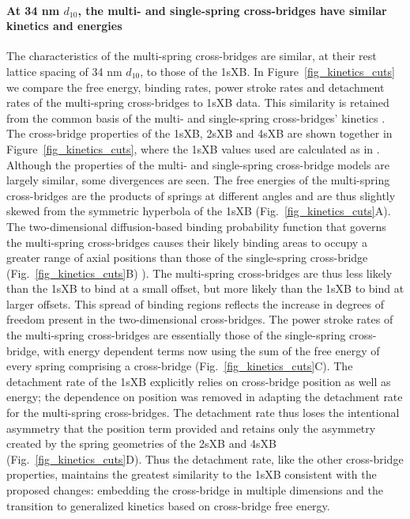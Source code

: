\documentclass[]{article}
\begin{document}
\paragraph{At 34 nm $d_{10}$, the multi- and single-spring cross-bridges have similar kinetics and energies} %
The characteristics of the multi-spring cross-bridges are similar, at their rest lattice spacing of 34 nm $d_{10}$, to those of the 1sXB\@.
In Figure~\ref{fig_kinetics_cuts} we compare the free energy, binding rates, power stroke rates and detachment rates of the multi-spring cross-bridges to 1sXB data. 
This similarity is retained from the common basis of the multi- and single-spring cross-bridges' kinetics \citep{Pate1989}.
The cross-bridge properties of the 1sXB, 2sXB and 4sXB are shown together in Figure~\ref{fig_kinetics_cuts}, where the 1sXB values used are calculated as in \citet[Fig.~10]{Tanner2007}. 
Although the properties of the multi- and single-spring cross-bridge models are largely similar, some divergences are seen. 
The free energies of the multi-spring cross-bridges are the products of springs at different angles and are thus slightly skewed from the symmetric hyperbola of the 1sXB  (Fig.~\ref{fig_kinetics_cuts}A).
The two-dimensional diffusion-based binding probability function that governs the multi-spring cross-bridges causes their likely binding areas to occupy a greater range of axial positions than those of the single-spring cross-bridge (Fig.~\ref{fig_kinetics_cuts}B) \citep{BergBook, DillBook}).
The multi-spring cross-bridges are thus less likely than the 1sXB to bind at a small offset, but more likely than the 1sXB to bind at larger offsets. 
This spread of binding regions reflects the increase in degrees of freedom present in the two-dimensional cross-bridges. 
The power stroke rates of the multi-spring cross-bridges are essentially those of the single-spring cross-bridge, with energy dependent terms now using the  sum of the free energy of every spring comprising a cross-bridge  (Fig.~\ref{fig_kinetics_cuts}C). 
The detachment rate of the 1sXB explicitly relies on cross-bridge position as well as energy; the dependence on position was removed in adapting the detachment rate for the multi-spring cross-bridges. 
The detachment rate thus loses the intentional asymmetry that the position term provided and retains only the asymmetry created by the spring geometries of the 2sXB and 4sXB (Fig.~\ref{fig_kinetics_cuts}D). 
Thus the detachment rate, like the other cross-bridge properties, maintains the greatest similarity to the 1sXB consistent with the proposed changes: embedding the cross-bridge in multiple dimensions and the transition to generalized kinetics based on cross-bridge free energy. 
\end{document}
